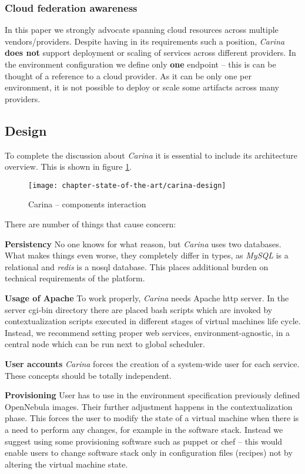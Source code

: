 \subsubsection{Cloud federation awareness}
In this paper we strongly advocate spanning cloud resources across multiple vendors/providers. Despite having in its requirements such a position, \emph{Carina} \textbf{does not} support deployment or scaling of services across different providers. In the environment configuration we define only \textbf{one} endpoint -- this is can be thought of a reference to a cloud provider. As it can be only one per environment, it is not possible to deploy or scale some artifacts across many providers.

\subsection{Design}
To complete the discussion about \emph{Carina} it is essential to include its architecture overview. This is shown in figure \ref{sota:carina-design}.

\begin{figure}[!ht]
  \begin{center}
    \texttt{[image: chapter-state-of-the-art/carina-design]}
  \end{center}
  \caption{Carina -- components interaction}
  \label{sota:carina-design}
\end{figure}

There are number of things that cause concern:
\begin{asparaenum}
\item[\textbf{Persistency}] No one knows for what reason, but \emph{Carina} uses two databases. What makes things even worse, they completely differ in types, as \emph{MySQL} is a relational and \emph{redis} is a nosql database. This places additional burden on technical requirements of the platform.
\item[\textbf{Usage of Apache}] To work properly, \emph{Carina} needs Apache http server. In the server cgi-bin directory there are placed bash scripts which are invoked by contextualization scripts executed in different stages of virtual machines life cycle. Instead, we recommend setting proper web services, environment-agnostic, in a central node which can be run next to global scheduler.
\item[\textbf{User accounts}] \emph{Carina} forces the creation of a system-wide user for each service. These concepts should be totally independent.
\item[\textbf{Provisioning}] User has to use in the environment specification previously defined OpenNebula images. Their further adjustment happens in the contextualization phase. This forces the user to modify the state of a virtual machine when there is a need to perform any changes, for example in the software stack. Instead we suggest using some provisioning software such as puppet or chef -- this would enable users to change software stack only in configuration files (recipes) not by altering the virtual machine state.
\end{asparaenum}


